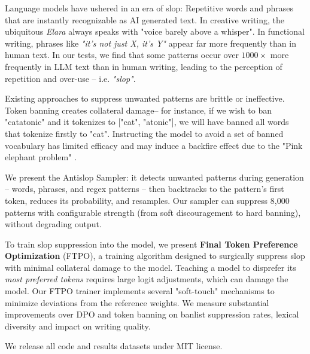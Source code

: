 \documentclass[11pt]{article}
\begin{document}
Language models have ushered in an era of slop: Repetitive words and phrases that are instantly recognizable as AI generated text\citep{wu2025survey}. In creative writing, the ubiquitous \textit{Elara} always speaks with "voice barely above a whisper". In functional writing, phrases like \textit{"it's not just X, it's Y"} appear far more frequently than in human text. In our tests, we find that some patterns occur over $1000{\times}$ more frequently in LLM text than in human writing, leading to the perception of repetition and over-use -- i.e. \textit{"slop"}.


Existing approaches to suppress unwanted patterns are brittle or ineffective. Token banning creates collateral damage-- for instance, if we wish to ban "catatonic" and it tokenizes to ["cat", "atonic"], we will have banned all words that tokenize firstly to "cat". Instructing the model to avoid a set of banned vocabulary has limited efficacy and may induce a backfire effect due to the "Pink elephant problem" \citep{castricato2024suppressing}.



We present the Antislop Sampler: it detects unwanted patterns during generation -- words, phrases, and regex patterns -- then backtracks to the pattern's first token, reduces its probability, and resamples. Our sampler can suppress 8,000 patterns with configurable strength (from soft discouragement to hard banning), without degrading output.

To train slop suppression into the model, we present \textbf{Final Token Preference Optimization} (FTPO), a training algorithm designed to surgically suppress slop with minimal collateral damage to the model. Teaching a model to disprefer its \textit{most preferred tokens} requires large logit adjustments, which can damage the model. Our FTPO trainer implements several "soft-touch" mechanisms to minimize deviations from the reference weights. We measure substantial improvements over DPO and token banning on banlist suppression rates, lexical diversity and impact on writing quality.

We release all code and results datasets under MIT license.
\end{document}
